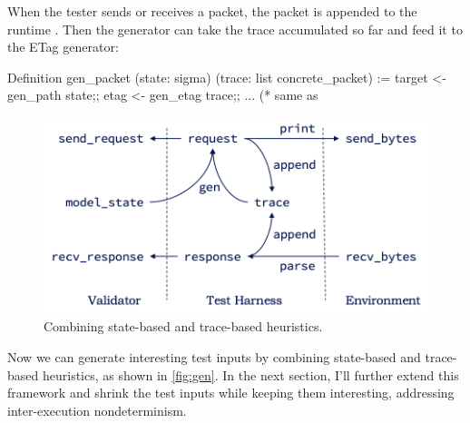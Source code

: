 When the tester sends or receives a packet, the packet is appended to the
runtime .  Then the  generator can take the trace
accumulated so far and feed it to the ETag generator:
\begin{coq}
  Definition gen_packet (state: sigma) (trace: list concrete_packet) :=
    target <- gen_path state;;
    etag   <- gen_etag trace;;
    ... (* same as %
\end{coq}

\begin{figure}
\includegraphics[width=.7\linewidth]{figures/gen}
\caption{Combining state-based and trace-based heuristics.}
\label{fig:gen}
\end{figure}

Now we can generate interesting test inputs by combining state-based and
trace-based heuristics, as shown in \autoref{fig:gen}.  In the next section,
I'll further extend this framework and shrink the test inputs while keeping them
interesting, addressing inter-execution nondeterminism.
